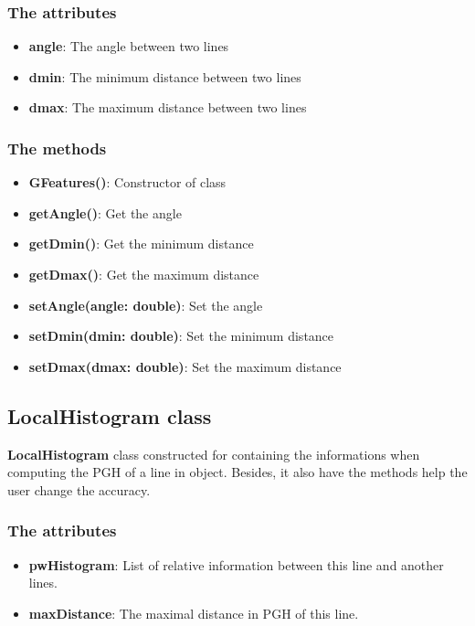 \subsubsection{The attributes}
\begin{itemize}
\item\textbf{angle}: The angle between two lines
\item\textbf{dmin}: The minimum distance between two lines
\item\textbf{dmax}: The maximum distance between two lines
\end{itemize}
\subsubsection{The methods}
\begin{itemize}
\item\textbf{GFeatures()}: Constructor of class
\item\textbf{getAngle()}: Get the angle 
\item\textbf{getDmin()}: Get the minimum distance
\item\textbf{getDmax()}: Get the maximum distance
\item\textbf{setAngle(angle: double)}: Set the angle
\item\textbf{setDmin(dmin: double)}: Set the minimum distance
\item\textbf{setDmax(dmax: double)}: Set the maximum distance
\end{itemize}
\subsection{LocalHistogram class}
\textbf{LocalHistogram} class constructed for containing the informations when computing the PGH of a line in object. Besides, it also have the methods help the user change the accuracy.
\subsubsection{The attributes}
\begin{itemize}
\item\textbf{pwHistogram}: List of relative information between this line and another lines. 
\item\textbf{maxDistance}: The maximal distance in PGH of this line.
\end{itemize}

